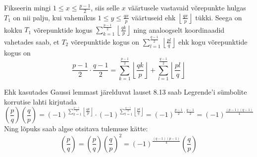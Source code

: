 \documentclass[a4paper, 10pt]{article}
\newcommand{\leg}[2]{\left(\frac{#1}{#2}\right)}
\begin{document}
Fikseerin mingi $1\leq x\leq \frac{p-1}{2}$, siis selle $x$ väärtusele vastavaid võrepunkte hulgas $T_1$ on nii palju, kui vahemikus $1\leq y\leq \frac{qx}{p}$ väärtuseid ehk $\left\lfloor\frac{qx}{p}\right\rfloor$ tükki. Seega on kokku $T_1$ võrepunktide kogus $\sum_{k=1}^{\frac{p-1}2}\left\lfloor\frac{qk}{p}\right\rfloor$ ning analoogselt koordinaadid vahetades saab, et $T_2$ võrepunktide kogus on $\sum_{l=1}^{\frac{q-1}2}\left\lfloor\frac{pl}{q}\right\rfloor$ ehk kogu võrepunktide kogus on $$\frac{p-1}2\cdot\frac{q-1}2=\sum_{k=1}^{\frac{p-1}2}\left\lfloor\frac{qk}{p}\right\rfloor+\sum_{l=1}^{\frac{q-1}2}\left\lfloor\frac{pl}{q}\right\rfloor$$

Ehk kasutades Gaussi lemmast järelduvat lauset 8.13 saab Legrende'i sümbolite korrutise lahti kirjutada $$\leg{p}{q}\leg{q}{p}=(-1)^{\sum_{k=1}^{\frac{p-1}2}\left\lfloor\frac{qk}{p}\right\rfloor}\cdot(-1)^{\sum_{l=1}^{\frac{q-1}2}\left\lfloor\frac{pl}{q}\right\rfloor}=(-1)^{\frac{p-1}{2}\cdot\frac{q-1}{2}}=(-1)^{\frac{(p-1)(q-1)}{4}}$$ Ning lõpuks saab algse otsitava tulemuse kätte: $$\leg pq = \leg pq\leg qp^2=(-1)^\frac{(q-1)(p-1)}4\leg qp$$
\bigskip
\end{document}
